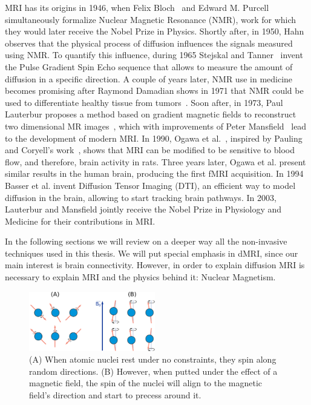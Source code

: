MRI has its origins in 1946, when Felix Bloch~\cite{Bloch1946} and Edward M.
Purcell~\cite{Purcell1946} simultaneously formalize Nuclear Magnetic Resonance
(NMR), work for which they would later receive the Nobel Prize in Physics. Shortly
after, in 1950, Hahn~\cite{Hahn1950} observes that the physical process of diffusion
influences the signals measured using NMR. To quantify this influence,
during 1965 Stejskal and Tanner~\cite{Stejskal1965} invent the Pulse Gradient
Spin Echo sequence that allows to measure the amount of diffusion in a specific
direction. A couple of years later, NMR use in medicine becomes promising after
Raymond Damadian shows in 1971 that NMR could be used to differentiate healthy
tissue from tumors~\cite{Reichson1971}. Soon after, in 1973, Paul Lauterbur
proposes a method based on gradient magnetic fields to reconstruct two
dimensional MR images~\cite{Lauterbur1973}, which with improvements of Peter
Mansfield~\cite{Mansfield1977} lead to the development of modern MRI. In 1990,
Ogawa et al.~\cite{Ogawa1993}, inspired by Pauling and Coryell's work~\cite{Pauling1936},
shows that MRI can be modified to be sensitive to blood flow, and therefore,
brain activity in rats. Three years later, Ogawa et al.\cite{Ogawa1990} present
similar results in the human brain, producing the first fMRI acquisition. In
1994 Basser et al. \cite{Basser1994} invent Diffusion Tensor Imaging (DTI), an
efficient way to model diffusion in the brain, allowing to start tracking
brain pathways. In 2003, Lauterbur and Mansfield jointly receive
the Nobel Prize in Physiology and Medicine for their contributions in MRI.

In the following sections we will review on a deeper way all the non-invasive
techniques used in this thesis. We will put special emphasis in dMRI, since our
main interest is brain connectivity. However, in order to explain diffusion MRI
is necessary to explain MRI and the physics behind it: Nuclear Magnetism.

\begin{figure}[h]
\includegraphics[width=0.49\textwidth]{3.mri/img/spin.png}
\caption{(A) When atomic nuclei rest under no constraints, they spin along
         random directions. (B) However, when putted under the effect of a
         magnetic field, the spin of the nuclei will align to the magnetic
         field's direction and start to precess around it.}
\label{fig:spin}
\end{figure} 

